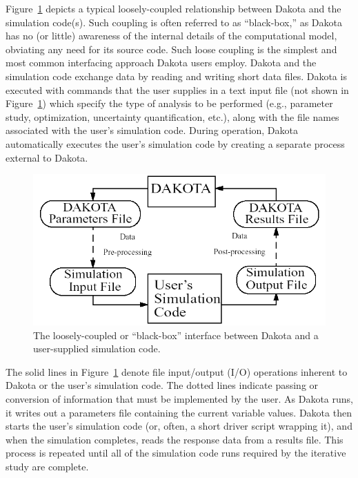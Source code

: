 Figure~\ref{intro:bbinterface} depicts a typical loosely-coupled
relationship between Dakota and the simulation code(s). Such coupling
is often referred to as ``black-box,'' as Dakota has no (or little)
awareness of the internal details of the computational model,
obviating any need for its source code. Such loose coupling is the
simplest and most common interfacing approach Dakota users
employ. Dakota and the simulation code exchange data by reading and
writing short data files. Dakota is executed with commands that the
user supplies in a text input file (not shown in
Figure~\ref{intro:bbinterface}) which specify the type of analysis to
be performed (e.g., parameter study, optimization, uncertainty
quantification, etc.), along with the file names associated with the
user's simulation code. During operation, Dakota automatically
executes the user's simulation code by creating a separate process
external to Dakota.

\begin{figure}
  \centering
  \includegraphics[scale=0.60]{images/dakota_flowchart}
  \caption{The loosely-coupled or ``black-box'' interface between
    Dakota and a user-supplied simulation code.}
  \label{intro:bbinterface}
\end{figure}

The solid lines in Figure~\ref{intro:bbinterface} denote file
input/output (I/O) operations inherent to Dakota or the user's
simulation code. The dotted lines indicate passing or conversion of
information that must be implemented by the user. As Dakota runs, it
writes out a parameters file containing the current variable values.
Dakota then starts the user's simulation code (or, often, a short
driver script wrapping it), and when the simulation completes, reads
the response data from a results file. This process is repeated until
all of the simulation code runs required by the iterative study are
complete.

